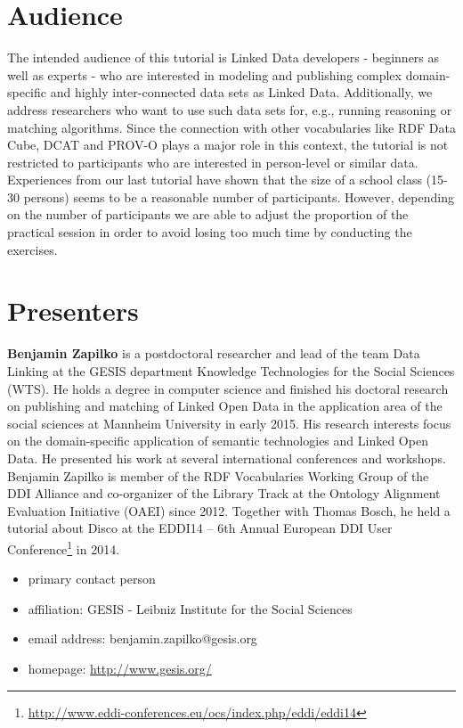 \documentclass{llncs}
\begin{document}
\section{Audience}
The intended audience of this tutorial is Linked Data developers - beginners as well as experts - who are interested in modeling and publishing complex domain-specific and highly inter-connected data sets as Linked Data. Additionally, we address researchers who want to use such data sets for, e.g., running reasoning or matching algorithms. Since the connection with other vocabularies like RDF Data Cube, DCAT and PROV-O plays a major role in this context, the tutorial is not restricted to participants who are interested in person-level or similar data. Experiences from our last tutorial have shown that the size of a school class (15-30 persons) seems to be a reasonable number of participants. However, depending on the number of participants we are able to adjust the proportion of the practical session in order to avoid losing too much time by conducting the exercises.

\section{Presenters}


\textbf{Benjamin Zapilko} is a postdoctoral researcher and lead of the team Data Linking at the GESIS department Knowledge Technologies for the Social Sciences (WTS). He holds a degree in computer science and finished his doctoral research on publishing and matching of Linked Open Data in the application area of the social sciences at Mannheim University in early 2015. His research interests focus on the domain-specific application of semantic technologies and Linked Open Data. He presented his work at several international conferences and workshops. Benjamin Zapilko is member of the RDF Vocabularies Working Group of the DDI Alliance and co-organizer of the Library Track at the Ontology Alignment Evaluation Initiative (OAEI) since 2012. Together with Thomas Bosch, he held a tutorial about Disco at the EDDI14 – 6th Annual European DDI User Conference\footnote{\url{http://www.eddi-conferences.eu/ocs/index.php/eddi/eddi14}} in 2014.

\begin{itemize}
\item primary contact person 
 \item affiliation: GESIS - Leibniz Institute for the Social Sciences
  \item email address: benjamin.zapilko@gesis.org
	\item homepage: \url{http://www.gesis.org/}
\end{itemize}
\end{document}
